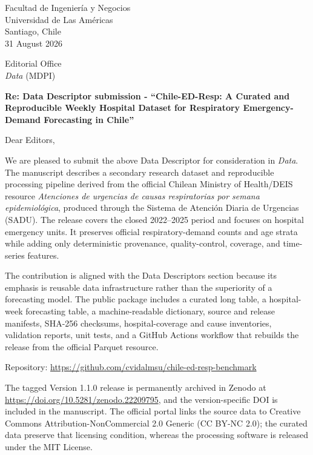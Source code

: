 \documentclass[10pt]{article}
\begin{document}
\thispagestyle{empty}

\begin{flushright}
Facultad de Ingenier\'ia y Negocios\\
Universidad de Las Am\'ericas\\
Santiago, Chile\\[4pt]
31 August 2026
\end{flushright}

Editorial Office\\
\textit{Data} (MDPI)

\textbf{Re: Data Descriptor submission - ``Chile-ED-Resp: A Curated and Reproducible Weekly Hospital Dataset for Respiratory Emergency-Demand Forecasting in Chile''}

Dear Editors,

We are pleased to submit the above Data Descriptor for consideration in \textit{Data}. The manuscript describes a secondary research dataset and reproducible processing pipeline derived from the official Chilean Ministry of Health/DEIS resource \textit{Atenciones de urgencias de causas respiratorias por semana epidemiol\'ogica}, produced through the Sistema de Atenci\'on Diaria de Urgencias (SADU). The release covers the closed 2022--2025 period and focuses on hospital emergency units. It preserves official respiratory-demand counts and age strata while adding only deterministic provenance, quality-control, coverage, and time-series features.

The contribution is aligned with the Data Descriptors section because its emphasis is reusable data infrastructure rather than the superiority of a forecasting model. The public package includes a curated long table, a hospital-week forecasting table, a machine-readable dictionary, source and release manifests, SHA-256 checksums, hospital-coverage and cause inventories, validation reports, unit tests, and a GitHub Actions workflow that rebuilds the release from the official Parquet resource.

Repository: \url{https://github.com/cvidalmsu/chile-ed-resp-benchmark}

The tagged Version 1.1.0 release is permanently archived in Zenodo at \url{https://doi.org/10.5281/zenodo.22209795}, and the version-specific DOI is included in the manuscript. The official portal links the source data to Creative Commons Attribution-NonCommercial 2.0 Generic (CC BY-NC 2.0); the curated data preserve that licensing condition, whereas the processing software is released under the MIT License.
\end{document}
